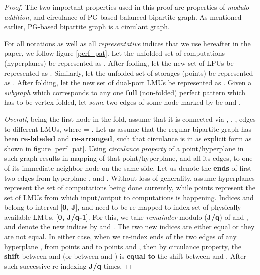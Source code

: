 \documentclass[12pt]{article}
\begin{document}
\begin{proof}
The two important properties used in this proof are properties of
\textit{modulo addition}, and
circulance of PG-based balanced bipartite graph. As
mentioned earlier, PG-based bipartite graph is a circulant
graph.

For all notations as well as all
\textit{representative} indices that we use hereafter in the paper, we
follow figure \ref{perf_pat}. Let
the unfolded set of computations (hyperplanes) be represented as . After folding, let the new set of LPUs be represented as . Similarly, let the unfolded set of storages (points)
be represented as . After folding, let
the new set of dual-port LMUs be represented as .
Given a \textit{subgraph} which corresponds to
any one \textbf{full} (non-folded) perfect
pattern which has to be vertex-folded, let \textit{some} two edges of
some node marked by  be  and .

\textit{Overall},  being the first node in the  fold,
assume that it is connected via
, , ,  edges to
different LMUs, where  =
{\large }. Let us assume that the regular
bipartite graph has been \textbf{re-labeled} and \textbf{re-arranged}, such that
circulance is in as explicit form as shown in figure
\ref{perf_pat}.
Using \textit{circulance property} of a point/hyperplane in such graph
results in mapping of that point/hyperplane, and all its edges, to one of
its immediate neighbor node on the same side. Let us
denote the \textbf{ends} of first two edges from
hyperplane ,  and .
Without loss of generality, assume hyperplanes
represent the set of computations being done currently, while points
represent the set of LMUs from which input/output to computations
is happening. Indices  and  belong to interval
[\textbf{0, J}], and need to be re-mapped to index set of physically available
LMUs, [\textbf{0, J/q-1}]. For this, we take
\textit{remainder} modulo-(\textbf{J/q}) of  and ,
and denote the new indices by  and . The two new indices are either equal
or they are not equal. In either case, when we re-index ends of
the two edges of any hyperplane , from points  and
 to points  and , then by circulance property, the \textbf{shift} between
 and  (or between  and )
is \textbf{equal to} the shift between  and
. After such successive re-indexing \textbf{J/q} times,


\end{proof}
\end{document}
